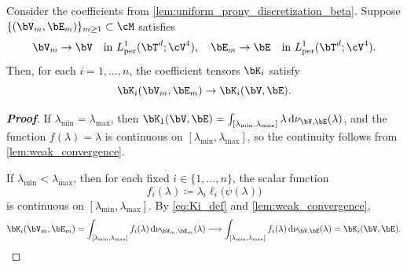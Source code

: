 \begin{corollary}
\label{cor:continuity_prony}
Consider the coefficients from \cref{lem:uniform_prony_discretization_beta}.
Suppose $\{(\bV_m,\bE_m)\}_{m\geq 1}\subset\cM$ satisfies
\begin{equation*}
    \bV_m\to\bV\quad \text{in } L^1_{\mathrm{per}}(\bT^d;\cV^{4}),\quad
    \bE_m\to\bE\quad \text{in } L^1_{\mathrm{per}}(\bT^d;\cV^{4}).
\end{equation*}
Then, for each $i=1,\dots,n$, the coefficient tensors $\bK_i$ satisfy
\begin{equation*}
    \bK_i(\bV_m,\bE_m)\to \bK_i(\bV,\bE).
\end{equation*}

\end{corollary}

\begin{proof}[\bf Proof]
If $\lambda_{\min}=\lambda_{\max}$, then $\bK_1(\bV,\bE)=\int_{[\lambda_{\min},\lambda_{\max}]} \lambda\,\mathrm{d}\nu_{\bV,\bE}(\lambda)$, and the function $f(\lambda)=\lambda$ is continuous on $[\lambda_{\min},\lambda_{\max}]$, so the continuity follows from \cref{lem:weak_convergence}.

If $\lambda_{\min}<\lambda_{\max}$, then for each fixed $i\in\{1,\dots,n\}$, the scalar function
\begin{equation*}
f_i(\lambda)\coloneqq \lambda_i\ell_i\bigl(\psi(\lambda)\bigr)
\end{equation*}
is continuous on $[\lambda_{\min},\lambda_{\max}]$. By \cref{eq:Ki_def} and \cref{lem:weak_convergence},
\begin{equation*}
\bK_i(\bV_m,\bE_m)
=\int_{[\lambda_{\min},\lambda_{\max}]} f_i(\lambda)\,\mathrm d\nu_{\bV_m,\bE_m}(\lambda)
\longrightarrow
\int_{[\lambda_{\min},\lambda_{\max}]} f_i(\lambda)\,\mathrm d\nu_{\bV,\bE}(\lambda)
=\bK_i(\bV,\bE).
\end{equation*}
\end{proof}

